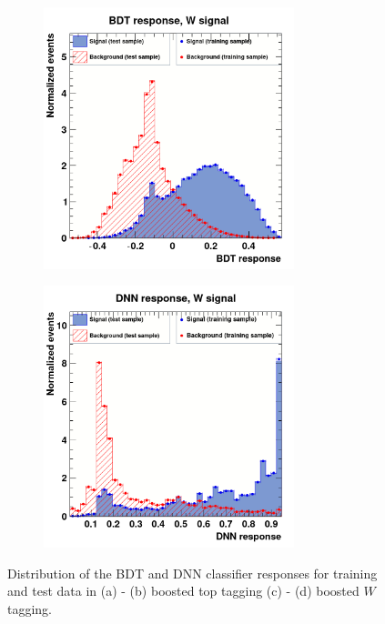 \documentclass[main]{subfiles} %
\begin{document}
\begin{figure}[H]
\begin{subfigure}[h]{0.49\textwidth}
          \caption{}
         \label{fig:top_DNN_overtraining}
     \end{subfigure}
     \par\bigskip
     \begin{subfigure}[h]{0.49\textwidth}
         \centering
         \includegraphics[width=0.8\textwidth]{../Figures/Results/overtraining/W_overtraining_BDT.png}
          \caption{}
         \label{fig:W_BDT_overtraining}
     \end{subfigure}
     \begin{subfigure}[h]{0.49\textwidth}
         \centering
         \includegraphics[width=0.8\textwidth]{../Figures/Results/overtraining/W_overtraining_DNN.png}
          \caption{}
         \label{fig:W_DNN_overtraining}
     \end{subfigure}
     \caption{Distribution of the BDT and DNN classifier responses for training and test data in (a) - (b) boosted top tagging (c) - (d) boosted $W$ tagging.}
        \label{fig:overtraining}
\end{figure}
\end{document}
